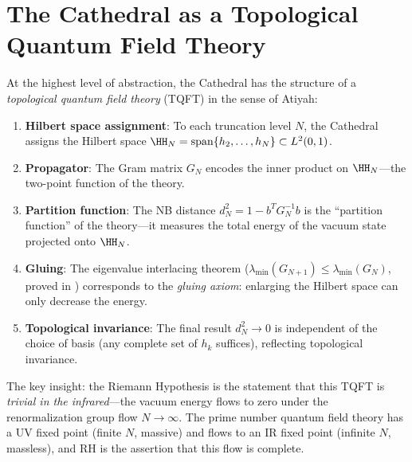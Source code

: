 \section{The Cathedral as a Topological Quantum Field Theory}
\label{sec:tqft}

At the highest level of abstraction, the Cathedral has the structure
of a \emph{topological quantum field theory} (TQFT) in the sense
of Atiyah:

\begin{enumerate}
  \item \textbf{Hilbert space assignment}: To each truncation level $N$,
    the Cathedral assigns the Hilbert space
    $\HH_N = \operatorname{span}\{h_2, \ldots, h_N\} \subset L^2(0,1)$.

  \item \textbf{Propagator}: The Gram matrix $G_N$ encodes the inner
    product on $\HH_N$---the two-point function of the theory.

  \item \textbf{Partition function}: The NB distance $d_N^2 = 1 - b^T G_N^{-1} b$
    is the ``partition function'' of the theory---it measures the total
    energy of the vacuum state projected onto $\HH_N$.

  \item \textbf{Gluing}: The eigenvalue interlacing theorem
    ($\lambda_{\min}(G_{N+1}) \leq \lambda_{\min}(G_N)$, proved in
    ) corresponds to the \emph{gluing
    axiom}: enlarging the Hilbert space can only decrease the energy.

  \item \textbf{Topological invariance}: The final result $d_N^2 \to 0$
    is independent of the choice of basis (any complete set of $h_k$
    suffices), reflecting topological invariance.
\end{enumerate}

The key insight: the Riemann Hypothesis is the statement that this
TQFT is \emph{trivial in the infrared}---the vacuum energy flows to
zero under the renormalization group flow $N \to \infty$. The prime
number quantum field theory has a UV fixed point (finite $N$, massive)
and flows to an IR fixed point (infinite $N$, massless), and RH is the
assertion that this flow is complete.

